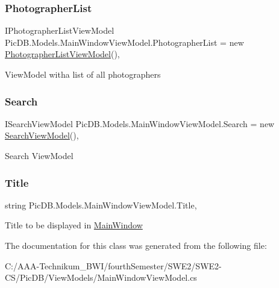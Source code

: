 \subsubsection{\texorpdfstring{Photographer\+List}{PhotographerList}}
{\footnotesize\ttfamily I\+Photographer\+List\+View\+Model Pic\+D\+B.\+Models.\+Main\+Window\+View\+Model.\+Photographer\+List = new \mbox{\hyperlink{class_pic_d_b_1_1_view_models_1_1_photographer_list_view_model}{Photographer\+List\+View\+Model}}()\hspace{0.3cm}{\ttfamily [get]}, {\ttfamily [set]}}



View\+Model witha list of all photographers 

\mbox{\label{class_pic_d_b_1_1_models_1_1_main_window_view_model_ac59235f79afc4e764b72fffd719fa9fd}} 
\subsubsection{\texorpdfstring{Search}{Search}}
{\footnotesize\ttfamily I\+Search\+View\+Model Pic\+D\+B.\+Models.\+Main\+Window\+View\+Model.\+Search = new \mbox{\hyperlink{class_pic_d_b_1_1_models_1_1_search_view_model}{Search\+View\+Model}}()\hspace{0.3cm}{\ttfamily [get]}, {\ttfamily [set]}}



Search View\+Model 

\mbox{\label{class_pic_d_b_1_1_models_1_1_main_window_view_model_a4c06e423175530049a3b2df513a35786}} 
\subsubsection{\texorpdfstring{Title}{Title}}
{\footnotesize\ttfamily string Pic\+D\+B.\+Models.\+Main\+Window\+View\+Model.\+Title\hspace{0.3cm}{\ttfamily [get]}, {\ttfamily [set]}}



Title to be displayed in \mbox{\hyperlink{class_pic_d_b_1_1_main_window}{Main\+Window}} 



The documentation for this class was generated from the following file\+:\begin{DoxyCompactItemize}
\item 
C\+:/\+A\+A\+A-\/\+Technikum\+\_\+\+B\+W\+I/fourth\+Semester/\+S\+W\+E2/\+S\+W\+E2-\/\+C\+S/\+Pic\+D\+B/\+View\+Models/Main\+Window\+View\+Model.\+cs\end{DoxyCompactItemize}
